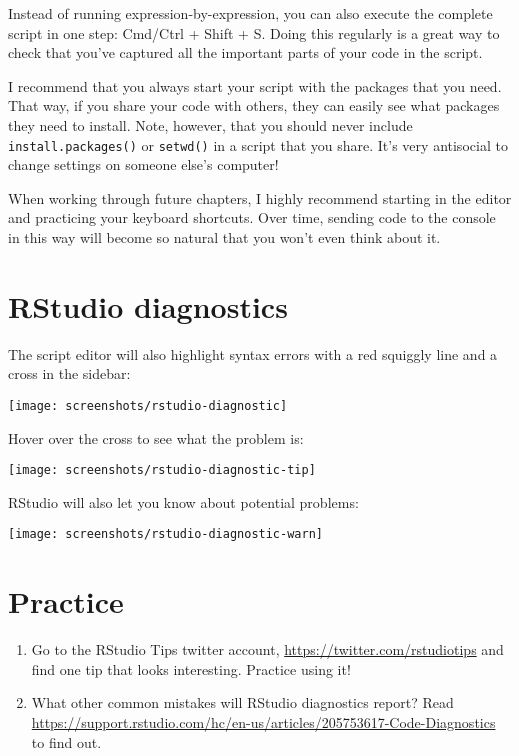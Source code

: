 \documentclass[]{book}
\begin{document}
Instead of running expression-by-expression, you can also execute the
complete script in one step: Cmd/Ctrl + Shift + S. Doing this regularly
is a great way to check that you've captured all the important parts of
your code in the script.

I recommend that you always start your script with the packages that you
need. That way, if you share your code with others, they can easily see
what packages they need to install. Note, however, that you should never
include \texttt{install.packages()} or \texttt{setwd()} in a script that
you share. It's very antisocial to change settings on someone else's
computer!

When working through future chapters, I highly recommend starting in the
editor and practicing your keyboard shortcuts. Over time, sending code
to the console in this way will become so natural that you won't even
think about it.

\section{RStudio diagnostics}\label{rstudio-diagnostics}

The script editor will also highlight syntax errors with a red squiggly
line and a cross in the sidebar:

\begin{center}\texttt{[image: screenshots/rstudio-diagnostic]} \end{center}

Hover over the cross to see what the problem is:

\begin{center}\texttt{[image: screenshots/rstudio-diagnostic-tip]} \end{center}

RStudio will also let you know about potential problems:

\begin{center}\texttt{[image: screenshots/rstudio-diagnostic-warn]} \end{center}

\section{Practice}\label{practice-1}

\begin{enumerate}
\def\labelenumi{\arabic{enumi}.}
\item
  Go to the RStudio Tips twitter account,
  \url{https://twitter.com/rstudiotips} and find one tip that looks
  interesting. Practice using it!
\item
  What other common mistakes will RStudio diagnostics report? Read
  \url{https://support.rstudio.com/hc/en-us/articles/205753617-Code-Diagnostics}
  to find out.
\end{enumerate}
\end{document}
